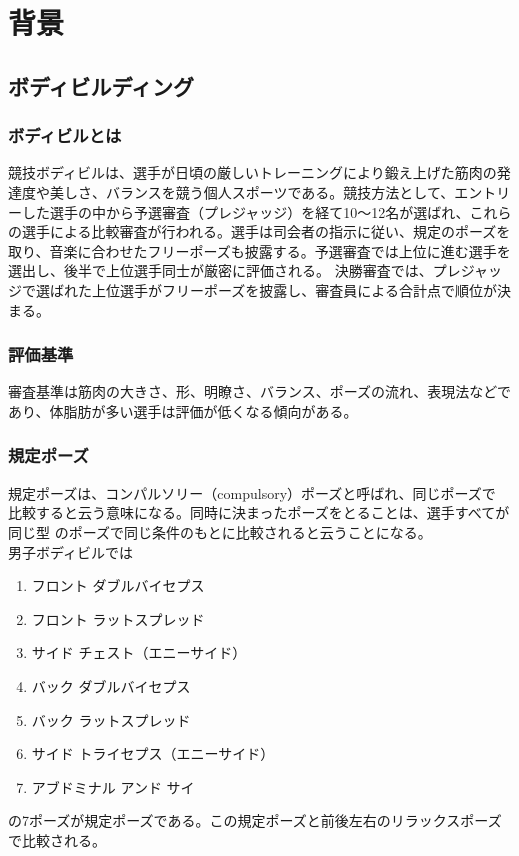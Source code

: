 \chapter{背景}
\label{background}
\section{ボディビルディング}
\subsection{ボディビルとは}
競技ボディビルは、選手が日頃の厳しいトレーニングにより鍛え上げた筋肉の発達度や美しさ、バランスを競う個人スポーツである。競技方法として、エントリーした選手の中から予選審査（プレジャッジ）を経て10～12名が選ばれ、これらの選手による比較審査が行われる。選手は司会者の指示に従い、規定のポーズを取り、音楽に合わせたフリーポーズも披露する。予選審査では上位に進む選手を選出し、後半で上位選手同士が厳密に評価される。
決勝審査では、プレジャッジで選ばれた上位選手がフリーポーズを披露し、審査員による合計点で順位が決まる。\cite{bodybuilding}\\

\subsection{評価基準}
審査基準は筋肉の大きさ、形、明瞭さ、バランス、ポーズの流れ、表現法などであり、体脂肪が多い選手は評価が低くなる傾向がある。
\subsection{規定ポーズ}
規定ポーズは、コンパルソリー（compulsory）ポーズと呼ばれ、同じポーズで
比較すると云う意味になる。同時に決まったポーズをとることは、選手すべてが同じ型
のポーズで同じ条件のもとに比較されると云うことになる。\cite{posing_performance_jbbf} \\
男子ボディビルでは
\begin{enumerate}
    \item フロント ダブルバイセプス
    \item フロント ラットスプレッド
    \item サイド チェスト（エニーサイド）
    \item バック ダブルバイセプス
    \item バック ラットスプレッド
    \item サイド トライセプス（エニーサイド）
    \item アブドミナル アンド サイ
\end{enumerate}
の7ポーズが規定ポーズである。この規定ポーズと前後左右のリラックスポーズで比較される。

